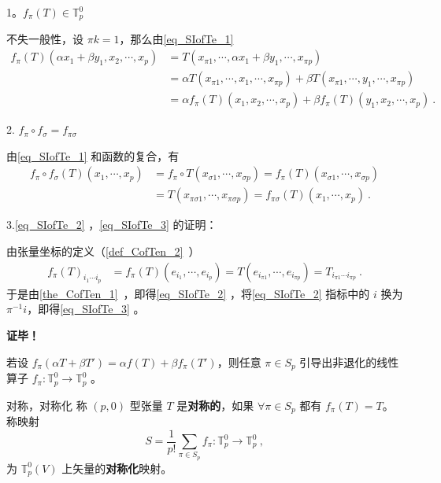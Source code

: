 1。$f_\pi(T)\in\mathbb{T}_p^0$

不失一般性，设 $\pi k=1$，那么由\autoref{eq_SIofTe_1} 
\begin{equation}
\begin{aligned}
f_\pi(T)(\alpha x_1+\beta y_1,x_2,\cdots,x_p)&=T(x_{\pi1},\cdots,\alpha x_1+\beta y_1,\cdots,x_{\pi p})\\
&=\alpha T(x_{\pi1},\cdots,x_1,\cdots,x_{\pi p})+\beta T(x_{\pi1},\cdots,y_1,\cdots,x_{\pi p})\\
&=\alpha f_{\pi}(T)(x_1,x_2,\cdots,x_p)+\beta f_{\pi}(T)(y_1,x_2,\cdots,x_p)~.
\end{aligned}
\end{equation}

2. $f_\pi \circ f_\sigma=f_{\pi\sigma}$

由\autoref{eq_SIofTe_1} 和函数的复合，有
\begin{equation}
\begin{aligned}
f_\pi\circ f_\sigma(T)(x_1,\cdots,x_p)&=f_\pi\circ T(x_{\sigma1},\cdots,x_{\sigma p})=f_\pi(T)(x_{\sigma1},\cdots,x_{\sigma p})\\
&=T(x_{\pi\sigma1},\cdots,x_{\pi\sigma p})=f_{\pi\sigma}(T)(x_1,\cdots,x_p)~.
\end{aligned}
\end{equation}


3.\autoref{eq_SIofTe_2} ，\autoref{eq_SIofTe_3} 的证明：

由张量坐标的定义（\autoref{def_CofTen_2}~）
\begin{equation}
\begin{aligned}
f_{\pi}(T)_{i_1\cdots i_p}&=f_{\pi}(T)(e_{i_1},\cdots,e_{i_p})=T(e_{i_{\pi1}},\cdots,e_{i_{\pi p}})=T_{i_{\pi1}\cdots i_{\pi p}}~.
\end{aligned}
\end{equation}
于是由\autoref{the_CofTen_1}~，即得\autoref{eq_SIofTe_2} ，将\autoref{eq_SIofTe_2} 指标中的 $i$ 换为  $\pi^{-1} i$，即得\autoref{eq_SIofTe_3} 。

\textbf{证毕！}

若设 $f_\pi(\alpha T+\beta T')=\alpha f(T)+\beta f_\pi(T')$，则任意 $\pi \in S_p$ 引导出非退化的线性算子 $f_\pi:\mathbb{T}_p^0\rightarrow\mathbb{T}_p^0$ 。

\begin{definition}{对称，对称化}
称 $(p,0)$ 型张量 $T$ 是\textbf{对称的}，如果 $\forall \pi\in S_p$ 都有 $f_{\pi}(T)=T$。称映射 
\begin{equation}
S=\frac{1}{p!}\sum_{\pi\in S_p} f_\pi:\mathbb{T}_p^0\rightarrow\mathbb{T}_p^0~,
\end{equation}
为 $\mathbb{T}_p^0(V)$ 上矢量的\textbf{对称化}映射。
\end{definition}

